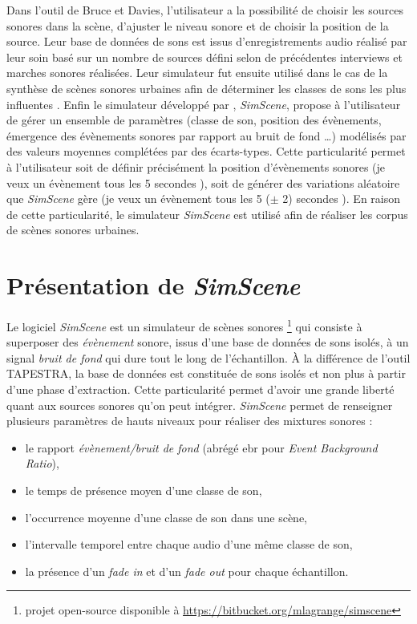 Dans l'outil de Bruce et Davies, l'utilisateur a la possibilité de choisir les sources sonores dans la scène, d'ajuster le niveau sonore et de choisir la position de la source. Leur base de données de sons est issus d'enregistrements audio réalisé par leur soin basé sur un nombre de sources défini selon de précédentes interviews et marches sonores réalisées. Leur simulateur fut ensuite utilisé dans le cas de la synthèse de scènes sonores urbaines afin de déterminer les classes de sons les plus influentes \cite{davies2014soundscape}.
Enfin le simulateur développé par \cite{rossignol_simscene_2015}, \textit{SimScene}, propose à l'utilisateur de gérer un ensemble de paramètres (classe de son, position des évènements, émergence des évènements sonores par rapport au bruit de fond \dots) modélisés par des valeurs moyennes complétées par des écarts-types.
Cette particularité permet à l'utilisateur soit de définir précisément la position d'évènements sonores (\og je veux un évènement tous les 5 secondes \fg{}), soit de générer des variations aléatoire que \textit{SimScene} gère (\og je veux un évènement tous les 5 ($\pm$ 2) secondes \fg{}). En raison de cette particularité, le simulateur \textit{SimScene} est utilisé afin de réaliser les corpus de scènes sonores urbaines.

\section{Présentation de \textit{SimScene}}
Le logiciel \textit{SimScene} \cite{rossignol_simscene_2015} est un simulateur de scènes sonores \footnote{projet open-source disponible à \url{https://bitbucket.org/mlagrange/simscene}} qui consiste à superposer des \textit{évènement} sonore, issus d'une base de données de sons isolés, à un signal \textit{bruit de fond} qui dure tout le long de l'échantillon. À la différence de l'outil TAPESTRA, la base de données est constituée de sons isolés et non plus à partir d'une phase d'extraction. Cette particularité permet d'avoir une grande liberté quant aux sources sonores qu'on peut intégrer. \textit{SimScene} permet de renseigner plusieurs paramètres de hauts niveaux pour réaliser des mixtures sonores :

\begin{itemize}
\item le rapport \textit{évènement/bruit de fond} (abrégé ebr pour \textit{Event Background Ratio}),
\item le temps de présence moyen d'une classe de son,
\item l'occurrence moyenne d'une classe de son dans une scène,
\item l'intervalle temporel entre chaque audio d'une même classe de son,
\item la présence d'un \textit{fade in} et d'un \textit{fade out} pour chaque échantillon.\\
\end{itemize}

